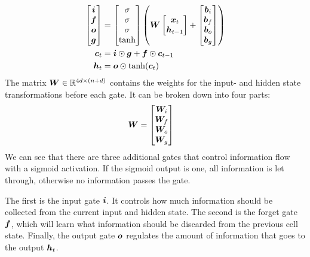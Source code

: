		\begin{align}\label{eq:Vanilla-LSTM-Definition}
			\begin{split}
				\begin{bmatrix}
					\bm{i} \\ 
					\bm{f} \\ 
					\bm{o} \\ 
					\bm{g}
				\end{bmatrix}
				&=
				\begin{bmatrix}
					\sigma \\ 
					\sigma \\ 
					\sigma \\ 
					\tanh
				\end{bmatrix}
				\left(
				\bm{W}
				\begin{bmatrix}
					\bm{x}_t \\
					\bm{h}_{t-1}
				\end{bmatrix}
				+
				\begin{bmatrix}
					\bm{b}_i \\ 
					\bm{b}_f \\ 
					\bm{b}_o \\ 
					\bm{b}_g
				\end{bmatrix}
				\right)
				\\
				\bm{c}_t &= \bm{i} \odot \bm{g} + \bm{f} \odot \bm{c}_{t-1} \\
				\bm{h}_t &= \bm{o} \odot \tanh(\bm{c}_{t})
			\end{split}
		\end{align}
		The matrix $\bm{W} \in \mathbb{R}^{4d \times (n + d)}$ contains the weights for the input- and hidden state transformations before each gate.
		It can be broken down into four parts:
		\begin{align}
			\bm{W} &=
			\begin{bmatrix}
				\bm{W}_i \\ 
				\bm{W}_f \\ 
				\bm{W}_o \\ 
				\bm{W}_g
			\end{bmatrix}
		\end{align}
		We can see that there are three additional gates that control information flow with a sigmoid activation.
		If the sigmoid output is one, all information is let through, otherwise no information passes the gate. 
		
		The first is the input gate $\bm{i}$.
		It controls how much information should be collected from the current input and hidden state.
		The second is the forget gate $\bm{f}$, which will learn what information should be discarded from the previous cell state.
		Finally, the output gate $\bm{o}$ regulates the amount of information that goes to the output $\bm{h}_t$.
		
